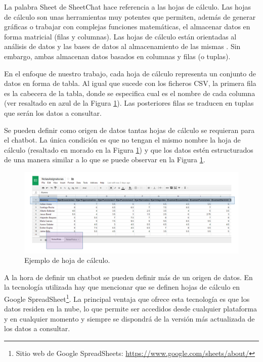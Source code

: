 La palabra Sheet de SheetChat hace referencia a las hojas de cálculo. Las hojas de cálculo son unas herramientas muy potentes que permiten, además de generar gráficas o trabajar con complejas funciones matemáticas, el almacenar datos en forma matricial (filas y columnas). Las hojas de cálculo están orientadas al análisis de datos y las bases de datos al almacenamiento de las mismas \cite{Philips2014}. Sin embargo, ambas almacenan datos basados en columnas y filas (o tuplas).

En el enfoque de nuestro trabajo, cada hoja de cálculo representa un conjunto de datos en forma de tabla. Al igual que sucede con los ficheros CSV, la primera fila es la cabecera de la tabla, donde se especifica cual es el nombre de cada columna (ver resaltado en azul de la Figura \ref{fig:SheetExample}). Las posteriores filas se traducen en tuplas que serán los datos a consultar.

Se pueden definir como origen de datos tantas hojas de cálculo se requieran para el chatbot. La única condición es que no tengan el mismo nombre la hoja de cálculo (resaltado en morado en la Figura \ref{fig:SheetExample}) y que los datos estén estructurados de una manera similar a lo que se puede observar en la Figura \ref{fig:SheetExample}.

\begin{figure}[htb]
	\centering
	\includegraphics[width=1.1\textwidth]{./figs/SheetExample.png}
	\caption{Ejemplo de hoja de cálculo.}
	\label{fig:SheetExample}
\end{figure}

A la hora de definir un chatbot se pueden definir más de un origen de datos. En la tecnología utilizada hay que mencionar que se definen hojas de cálculo en Google SpreadSheet\footnote{Sitio web de Google SpreadSheets: \url{https://www.google.com/sheets/about/}}. La principal ventaja que ofrece esta tecnología es que los datos residen en la nube, lo que permite ser accedidos desde cualquier plataforma y en cualquier momento y siempre se dispondrá de la versión más actualizada de los datos a consultar.


